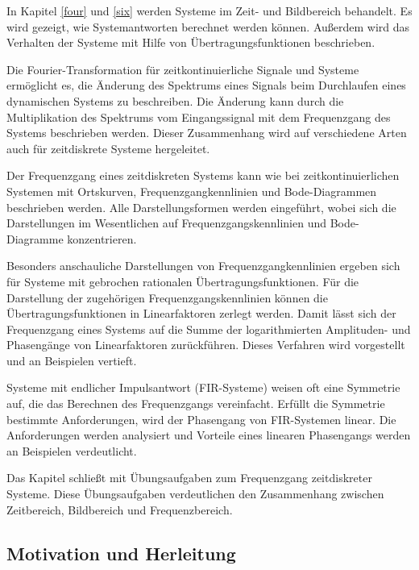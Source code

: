 \noindent In Kapitel \ref{four} und \ref{six} werden Systeme im Zeit- und Bildbereich behandelt. Es wird gezeigt, wie Systemantworten berechnet werden k\"{o}nnen. Au{\ss}erdem wird das Verhalten der Systeme mit Hilfe von \"{U}bertragungsfunktionen beschrieben.\newline

\noindent Die Fourier-Transformation f\"{u}r zeitkontinuierliche Signale und Systeme erm\"{o}glicht es, die \"{A}nderung des Spektrums eines Signals beim Durchlaufen eines dynamischen Systems zu beschreiben. Die \"{A}nderung kann durch die Multiplikation des Spektrums vom Eingangssignal mit dem Frequenzgang des Systems beschrieben werden. Dieser Zusammenhang wird auf verschiedene Arten auch f\"{u}r zeitdiskrete Systeme hergeleitet.\newline 

\noindent Der Frequenzgang eines zeitdiskreten Systems kann wie bei zeitkontinuierlichen Systemen mit Ortskurven, Frequenzgangkennlinien und Bode-Diagrammen beschrieben werden. Alle Darstellungsformen werden eingef\"{u}hrt, wobei sich die Darstellungen im Wesentlichen auf Frequenzgangskennlinien und Bode-Diagramme konzentrieren. \newline

\noindent Besonders anschauliche Darstellungen von Frequenzgangkennlinien ergeben sich f\"{u}r Systeme mit gebrochen rationalen \"{U}bertragungsfunktionen. F\"{u}r die Darstellung der zugeh\"{o}rigen Frequenzgangskennlinien k\"{o}nnen die \"{U}bertragungsfunktionen in Linearfaktoren zerlegt werden. Damit l\"{a}sst sich der Frequenzgang eines Systems auf die Summe der logarithmierten Amplituden- und Phaseng\"{a}nge von Linearfaktoren zur\"{u}ckf\"{u}hren. Dieses Verfahren wird vorgestellt und an Beispielen vertieft.\newline

\noindent Systeme mit endlicher Impulsantwort (FIR-Systeme) weisen oft eine Symmetrie auf, die das Berechnen des Frequenzgangs vereinfacht. Erf\"{u}llt die Symmetrie bestimmte Anforderungen, wird der Phasengang von FIR-Systemen linear. Die Anforderungen werden analysiert und Vorteile eines linearen Phasengangs werden an Beispielen verdeutlicht.\newline

\noindent Das Kapitel schlie{\ss}t mit \"{U}bungsaufgaben zum Frequenzgang zeitdiskreter Systeme. Diese \"{U}bungsaufgaben verdeutlichen den Zusammenhang zwischen Zeitbereich, Bildbereich und Frequenzbereich.

\subsection{Motivation und Herleitung}\label{eightone}

